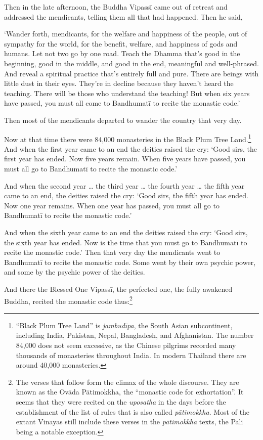 \documentclass[12pt,openany]{book}%
\begin{document}
Then in the late afternoon, the Buddha \textsanskrit{Vipassī} came out of retreat and addressed the mendicants, telling them all that had happened. Then he said, 

‘Wander forth, mendicants, for the welfare and happiness of the people, out of sympathy for the world, for the benefit, welfare, and happiness of gods and humans. Let not two go by one road. Teach the Dhamma that’s good in the beginning, good in the middle, and good in the end, meaningful and well-phrased. And reveal a spiritual practice that’s entirely full and pure. There are beings with little dust in their eyes. They’re in decline because they haven’t heard the teaching. There will be those who understand the teaching! But when six years have passed, you must all come to \textsanskrit{Bandhumatī} to recite the monastic code.’ 

Then most of the mendicants departed to wander the country that very day. 

Now at that time there were 84,000 monasteries in the Black Plum Tree Land.\footnote{“Black Plum Tree Land” is \textit{\textsanskrit{jambudīpa}}, the South Asian subcontinent, including India, Pakistan, Nepal, Bangladesh, and Afghanistan. The number 84,000 does not seem excessive, as the Chinese pilgrims recorded many thousands of monasteries throughout India. In modern Thailand there are around 40,000 monasteries. } And when the first year came to an end the deities raised the cry: ‘Good sirs, the first year has ended. Now five years remain. When five years have passed, you must all go to \textsanskrit{Bandhumatī} to recite the monastic code.’ 

And when the second year … the third year … the fourth year … the fifth year came to an end, the deities raised the cry: ‘Good sirs, the fifth year has ended. Now one year remains. When one year has passed, you must all go to \textsanskrit{Bandhumatī} to recite the monastic code.’ 

And when the sixth year came to an end the deities raised the cry: ‘Good sirs, the sixth year has ended. Now is the time that you must go to \textsanskrit{Bandhumatī} to recite the monastic code.’ Then that very day the mendicants went to \textsanskrit{Bandhumatī} to recite the monastic code. Some went by their own psychic power, and some by the psychic power of the deities. 

And there the Blessed One \textsanskrit{Vipassī}, the perfected one, the fully awakened Buddha, recited the monastic code thus:\footnote{The verses that follow form the climax of the whole discourse. They are known as the \textsanskrit{Ovāda} \textsanskrit{Pātimokkha}, the “monastic code for exhortation”. It seems that they were recited on the \textit{uposatha} in the days before the establishment of the list of rules that is also called \textit{\textsanskrit{pātimokkha}}. Most of the extant Vinayas still include these verses in the \textit{\textsanskrit{pātimokkha}} texts, the Pali being a notable exception. } 
\end{document}

